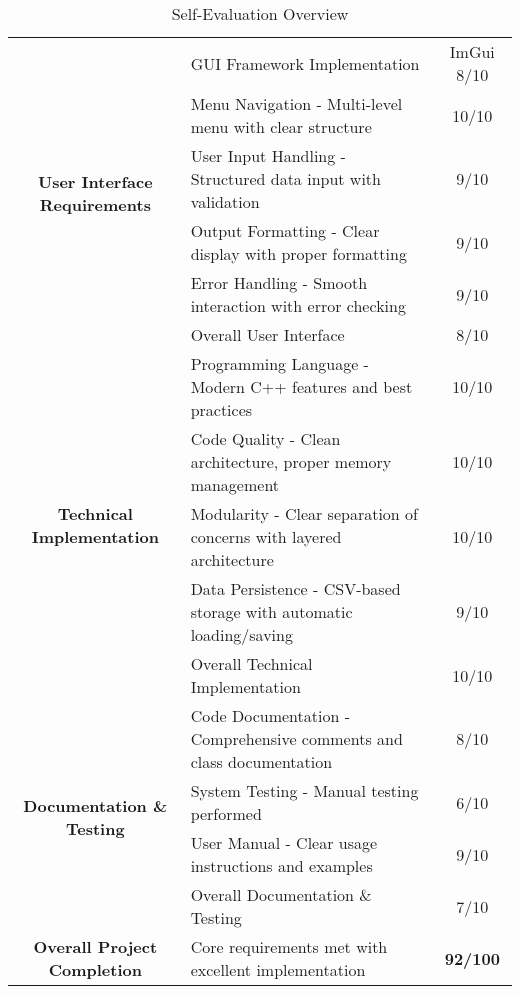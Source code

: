 \begin{center}
\begin{table}[H]
\begin{tabularx}{\textwidth}{| c | X | c |}
            \multirow{6}{*}{\parbox{4cm}{\centering\textbf{User Interface Requirements}}}
            & GUI Framework Implementation & ImGui 8/10 \\
            \cline{2-3}
             & Menu Navigation - Multi-level menu with clear structure & 10/10 \\
            \cline{2-3}
             & User Input Handling - Structured data input with validation & 9/10 \\
            \cline{2-3}
             & Output Formatting - Clear display with proper formatting & 9/10 \\
            \cline{2-3}
             & Error Handling - Smooth interaction with error checking & 9/10 \\
            \cline{2-3}
             & Overall User Interface & 8/10 \\
            \hline

            \multirow{5}{*}{\parbox{4cm}{\centering\textbf{Technical Implementation}}}
            & Programming Language - Modern C++ features and best practices & 10/10 \\
            \cline{2-3}
             & Code Quality - Clean architecture, proper memory management & 10/10 \\
            \cline{2-3}
             & Modularity - Clear separation of concerns with layered architecture & 10/10 \\
            \cline{2-3}
             & Data Persistence - CSV-based storage with automatic loading/saving & 9/10 \\
            \cline{2-3}
             & Overall Technical Implementation & 10/10 \\
            \hline

            \multirow{4}{*}{\parbox{4cm}{\centering\textbf{Documentation \& Testing}}}
            & Code Documentation - Comprehensive comments and class documentation & 8/10 \\
            \cline{2-3}
             & System Testing - Manual testing performed & 6/10 \\
            \cline{2-3}
             & User Manual - Clear usage instructions and examples & 9/10 \\
            \cline{2-3}
             & Overall Documentation \& Testing & 7/10 \\
            \hline

            \rowcolor{yellow!30}
            \textbf{Overall Project Completion}
            & Core requirements met with excellent implementation & \textbf{92/100} \\
            \hline
        \end{tabularx}
        
        \caption{Self-Evaluation Overview}
    \end{table}
\end{center}